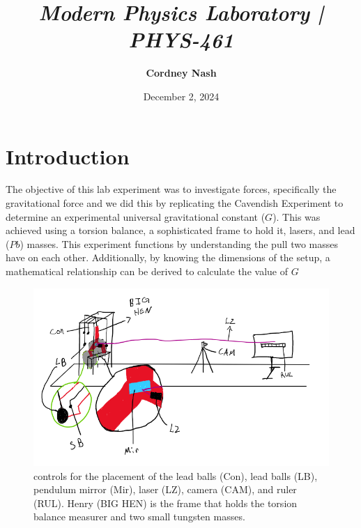 \documentclass[a4paper,12pt,english]{all-in-one} %
\title{{\large\textit{Modern Physics Laboratory | PHYS-461}}\\[0.5cm]{\Huge\color{gray}\textsc{\@docsubtitle}}}
\author{\textbf{Cordney Nash}  }
\date{December 2, 2024}
\begin{document}
\begin{titlepage}
\maketitle\vfill
\end{titlepage}
\newpage 


\section*{Introduction}
{
The objective of this lab experiment was to investigate forces, specifically the gravitational force and we did this by replicating the Cavendish Experiment to determine an experimental universal gravitational constant ($G$). This was achieved using a torsion balance, a sophisticated frame to hold it, lasers, and lead ($Pb$) masses. This experiment functions by understanding the pull two masses have on each other. Additionally, by knowing the dimensions of the setup, a mathematical relationship can be derived to calculate the value of $G$
}

\begin{figure}[tbh]
    \centering
    \includegraphics[width=0.8\linewidth]{7-cavendish/overleaf/droc/images/cavendish_schem.PNG}
    \caption{ \scriptsize{ controls for the placement of the lead balls (Con), lead balls (LB), pendulum mirror (Mir), laser (LZ), camera (CAM), and ruler (RUL). Henry (BIG HEN) is the frame that holds the torsion balance measurer and two small tungsten masses.
    }}
    \label{fig:cavndish-diagram}
\end{figure}

\end{document}
